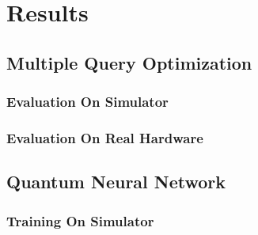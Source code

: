 \chapter{Results} %

\label{chapter:results} %


\section{Multiple Query Optimization}
\subsection{Evaluation On Simulator}

\subsection{Evaluation On Real Hardware}

\newpage

\section{Quantum Neural Network}

\subsection{Training On Simulator}


